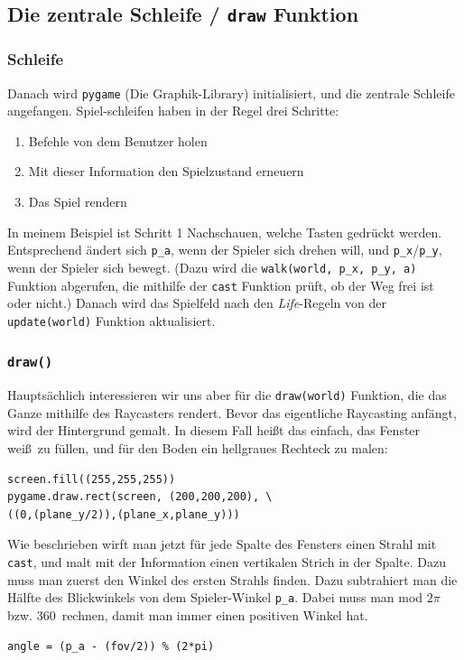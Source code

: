 \documentclass[a4paper,12pt]{report}
\begin{document}
\subsection{Die zentrale Schleife / \texttt{draw} Funktion}
\subsubsection{Schleife}
Danach wird \texttt{pygame} (Die Graphik-Library) initialisiert, und die zentrale Schleife angefangen. Spiel-schleifen haben in der Regel drei Schritte:
\begin{enumerate}
	\item Befehle von dem Benutzer holen
	\item Mit dieser Information den Spielzustand erneuern
	\item Das Spiel rendern
\end{enumerate}
In meinem Beispiel ist Schritt 1 Nachschauen, welche Tasten gedr\"uckt werden. Entsprechend \"andert sich \texttt{p\_a}, wenn der Spieler sich drehen will, und \texttt{p\_x}/\texttt{p\_y}, wenn der Spieler sich bewegt. (Dazu wird die \texttt{walk(world, p\_x, p\_y, a)} Funktion abgerufen, die mithilfe der \texttt{cast} Funktion pr\"uft, ob der Weg frei ist oder nicht.) Danach wird das Spielfeld nach den \textit{Life}-Regeln von der \texttt{update(world)} Funktion aktualisiert.

\subsubsection{\texttt{draw()}}
Haupts\"achlich interessieren wir uns aber f\"ur die \texttt{draw(world)} Funktion, die das Ganze mithilfe des Raycasters rendert. Bevor das eigentliche Raycasting anf\"angt, wird der Hintergrund gemalt. In diesem Fall hei\ss t das einfach, das Fenster wei\ss\ zu f\"ullen, und f\"ur den Boden ein hellgraues Rechteck zu malen:
\begin{Verbatim}[baselinestretch=1.0, xleftmargin=1cm]
screen.fill((255,255,255))
pygame.draw.rect(screen, (200,200,200), \
((0,(plane_y/2)),(plane_x,plane_y)))
\end{Verbatim}

Wie beschrieben wirft man jetzt f\"ur jede Spalte des Fensters einen Strahl mit \texttt{cast}, und malt mit der Information einen vertikalen Strich in der Spalte. Dazu muss man zuerst den Winkel des ersten Strahls finden. Dazu subtrahiert man die H\"alfte des Blickwinkels von dem Spieler-Winkel \texttt{p\_a}. Dabei muss man mod $2\pi$ bzw. 360\textdegree\ rechnen, damit man immer einen positiven Winkel hat.
\begin{Verbatim}[baselinestretch=1.0, xleftmargin=1cm]
angle = (p_a - (fov/2)) % (2*pi)
\end{Verbatim}
\end{document}
